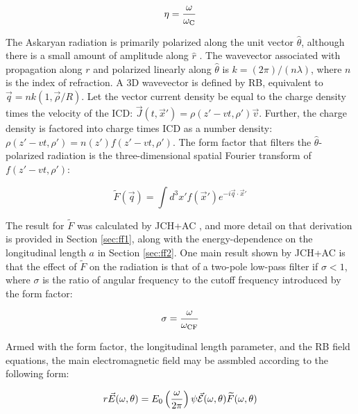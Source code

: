 \documentclass[amsmath,amssymb,aps,prd,10pt,twocolumn]{revtex4}
\begin{document}
\begin{equation}
\eta = \frac{\omega}{\omega_{\rm C}}
\label{eq:eta1}
\end{equation}

The Askaryan radiation is primarily polarized along the unit vector $\hat{\theta}$, although there is a small amount of amplitude along $\hat{r}$ \cite{10.1016/j.astropartphys.2017.03.008}.  The wavevector associated with propagation along $r$ and polarized linearly along $\hat{\theta}$ is $k = (2\pi)/(n\lambda)$, where $n$ is the index of refraction.  A 3D wavevector is defined by RB, equivalent to $\vec{q} = nk(1, \vec{\rho}/R)$.  Let the vector current density be equal to the charge density times the velocity of the ICD: $\vec{J}(t,\vec{x}') = \rho(z'-vt,\rho') \vec{v}$.  Further, the charge density is factored into charge times ICD as a number density: $\rho(z'-vt,\rho') = n(z') f(z'-vt,\rho')$.  The form factor that filters the $\hat{\theta}$-polarized radiation is the three-dimensional spatial Fourier transform of $f(z'-vt,\rho')$:

\begin{equation}
\widetilde{F}(\vec{q}) = \int d^3x' f(\vec{x}')e^{-i \vec{q} \cdot \vec{x}'}
\end{equation}

The result for $\widetilde{F}$ was calculated by JCH+AC \cite{10.1016/j.astropartphys.2017.03.008}, and more detail on that derivation is provided in Section \ref{sec:ff1}, along with the energy-dependence on the longitudinal length $a$ in Section \ref{sec:ff2}.  One main result shown by JCH+AC is that the effect of $\widetilde{F}$ on the radiation is that of a two-pole low-pass filter if $\sigma < 1$, where $\sigma$ is the ratio of angular frequency to the cutoff frequency introduced by the form factor:

\begin{equation}
\sigma = \frac{\omega}{\omega_{\rm CF}} \label{eq:sigma_0}
\end{equation}

Armed with the form factor, the longitudinal length parameter, and the RB field equations, the main electromagnetic field may be assmbled according to the following form:

\begin{equation}
r\vec{E}(\omega,\theta) = E_{\rm 0} \left( \frac{\omega}{2\pi} \right) \psi \vec{\mathcal{E}}(\omega,\theta) \widetilde{F}(\omega,\theta) \label{eq:main}
\end{equation}
\end{document}
